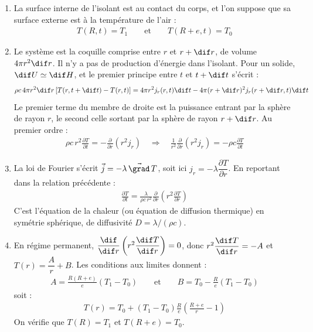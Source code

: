 \begin{correction}

\begin{enumerate}

	\item La surface interne de l'isolant est au contact du corps, et l'on suppose que sa surface externe est à la température de l'air :
	\begin{align*}
		T(R,t)=T_1 \qquad\text{et}\qquad T(R+e,t)=T_0
	\end{align*}

	\item Le système est la coquille comprise entre $r$ et $r+\dif r$, de volume $4\pi r^2\dif r$. Il n'y a pas de production d'énergie dans l'isolant. Pour un solide, $\dif U\simeq\dif H$, et le premier principe entre $t$ et $t+\dif t$ s'écrit :
	\begin{align*}
		\rho c\,4\pi r^2\dif r\left[T(r,t+\dif t)-T(r,t)\right]=4\pi r^2j_r(r,t)\dif t-4\pi (r+\dif r)^2j_r(r+\dif r,t)\dif t
	\end{align*}
	Le premier terme du membre de droite est la puissance entrant par la sphère de rayon $r$, le second celle sortant par la sphère de rayon $r+\dif r$. Au premier ordre :
	\begin{align*}
		\rho c\,r^2\frac{\partial T}{\partial t}=-\frac{\partial}{\partial r}\left(r^2j_r\right) \quad\Rightarrow\quad \boxed{\frac{1}{r^2}\frac{\partial }{\partial r}\left( r^2j_r\right) =-\rho c\frac{\partial T}{\partial t}}
	\end{align*}

	\item La loi de Fourier s'écrit $\vec{j}=-\lambda\,\vec{\grad}\,T$, soit ici $j_r=-\lambda\dfrac{\partial T}{\partial r}$. En reportant dans la relation précédente :
	\begin{align*}
		\boxed{\frac{\partial T}{\partial t}=\frac{\lambda}{\rho c\, r^2}\frac{\partial }{\partial r}\left( r^2\frac{\partial T}{\partial r}\right)}
	\end{align*}
	C'est l'équation de la chaleur (ou équation de diffusion thermique) en symétrie sphérique, de diffusivité $D=\lambda/(\rho c)$.

	\item En régime permanent, $\dfrac{\dif}{\dif r}\left(r^2\dfrac{\dif T}{\dif r}\right)=0$, donc $r^2\dfrac{\dif T}{\dif r}=-A$ et $T(r)=\dfrac{A}{r}+B$. Les conditions aux limites donnent :
	\begin{align*}
		A=\frac{R(R+e)}{e}(T_1-T_0) \qquad\text{et}\qquad B=T_0-\frac{R}{e}(T_1-T_0)
	\end{align*}
	soit :
	\begin{align*}
		\boxed{T(r)=T_0+(T_1-T_0)\frac{R}{e}\left(\frac{R+e}{r}-1\right)}
	\end{align*}
	On vérifie que $T(R)=T_1$ et $T(R+e)=T_0$.


\end{enumerate}
\end{correction}
